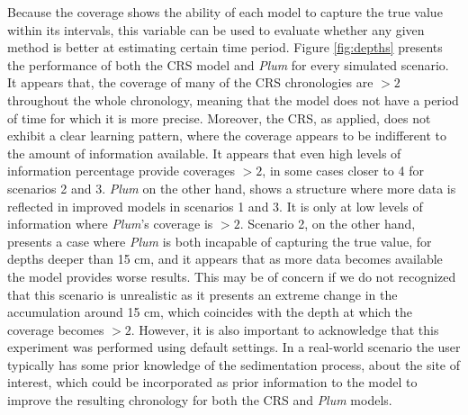 \documentclass [10pt] {article}
\begin{document}
Because the coverage shows the ability of each model to capture the true value within its intervals, this variable can be used to evaluate whether any given method is better at estimating certain time period.
Figure \ref{fig:depths} presents the performance of both the CRS model and \textit{Plum} for every simulated scenario.
It appears that, the coverage of many of the CRS chronologies are $> 2$ throughout the whole chronology, meaning that the model does not have a period of time for which it is more precise. 
Moreover, the CRS, as applied, does not exhibit a clear learning pattern, where the coverage appears to be indifferent to the amount of information available.
It appears that even high levels of information percentage provide coverages $> 2$, in some cases closer to 4 for scenarios 2 and 3.
\textit{Plum} on the other hand, shows a structure where more data is reflected in improved models in scenarios 1 and 3.
It is only at low levels of information where \textit{Plum}'s coverage is $>2$.
Scenario 2, on the other hand, presents a case where \textit{Plum} is both incapable of capturing the true value, for depths deeper than 15 cm, and it appears that as more data becomes available the model provides worse results. 
This may be of concern if we do not recognized that this scenario is unrealistic as it presents an extreme change in the accumulation around 15 cm, which coincides with the depth at which the coverage becomes $>2$.
However, it is also important to acknowledge that this experiment was performed using default settings.  
In a real-world scenario the user typically has some prior knowledge of the sedimentation process, about the site of interest, which could be incorporated as prior information to the model to improve the resulting chronology for both the CRS and \textit{Plum} models.

\end{document}
